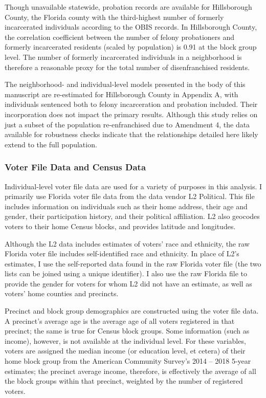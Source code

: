 \documentclass[
  12pt,
]{article}
\begin{document}
Though unavailable statewide, probation records are available for Hillsborough County, the Florida county with the third-highest number of formerly incarcerated individuals according to the OBIS records. In Hillsborough County, the correlation coefficient between the number of felony probationers and formerly incarcerated residents (scaled by population) is 0.91 at the block group level. The number of formerly incarcerated individuals in a neighborhood is therefore a reasonable proxy for the total number of disenfranchised residents.

The neighborhood- and individual-level models presented in the body of this manuscript are re-estimated for Hillsborough County in Appendix A, with individuals sentenced both to felony incarceration and probation included. Their incorporation does not impact the primary results. Although this study relies on just a subset of the population re-enfranchised due to Amendment 4, the data available for robustness checks indicate that the relationships detailed here likely extend to the full population.

\hypertarget{voter-file-data-and-census-data}{%
\subsubsection*{Voter File Data and Census Data}\label{voter-file-data-and-census-data}}

Individual-level voter file data are used for a variety of purposes in this analysis. I primarily use Florida voter file data from the data vendor L2 Political. This file includes information on individuals such as their home address, their age and gender, their participation history, and their political affiliation. L2 also geocodes voters to their home Census blocks, and provides latitude and longitudes.

Although the L2 data includes estimates of voters' race and ethnicity, the raw Florida voter file includes self-identified race and ethnicity. In place of L2's estimates, I use the self-reported data found in the raw Florida voter file (the two lists can be joined using a unique identifier). I also use the raw Florida file to provide the gender for voters for whom L2 did not have an estimate, as well as voters' home counties and precincts.

Precinct and block group demographics are constructed using the voter file data. A precinct's average age is the average age of all voters registered in that precinct; the same is true for Census block groups. Some information (such as income), however, is not available at the individual level. For these variables, voters are assigned the median income (or education level, et cetera) of their home block group from the American Community Survey's 2014 -- 2018 5-year estimates; the precinct average income, therefore, is effectively the average of all the block groups within that precinct, weighted by the number of registered voters.
\end{document}
